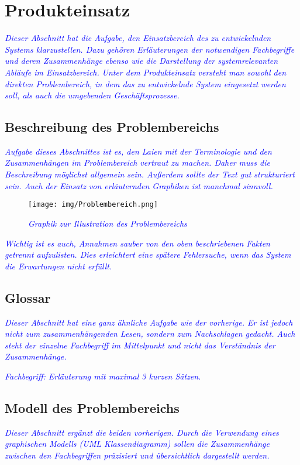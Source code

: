 \section{Produkteinsatz}
\textcolor{blue}{\textit{Dieser Abschnitt hat die Aufgabe, den Einsatzbereich des zu entwickelnden Systems klarzustellen. Dazu gehören Erläuterungen der notwendigen Fachbegriffe und deren Zusammenhänge ebenso wie die Darstellung der systemrelevanten Abläufe im Einsatzbereich.}}
\textcolor{blue}{\textit{Unter dem Produkteinsatz versteht man sowohl den direkten Problembereich, in dem das zu entwickelnde System eingesetzt werden soll, als auch die umgebenden Geschäftsprozesse.
}}

\subsection{Beschreibung des Problembereichs}
\textcolor{blue}{\textit{Aufgabe dieses Abschnittes ist es, den Laien mit der Terminologie und den Zusammenhängen im Problembereich vertraut zu machen. Daher muss die Beschreibung möglichst allgemein sein. Außerdem sollte der Text gut strukturiert sein. Auch der Einsatz von erläuternden Graphiken ist manchmal sinnvoll.}}

\begin{figure}[H]
\centering
\texttt{[image: img/Problembereich.png]}
\caption{\textcolor{blue}{\textit{Graphik zur Illustration des Problembereichs}}}
\label{Problembereich}
\end{figure}

\textcolor{blue}{\textit{Wichtig ist es auch, Annahmen sauber von den oben beschriebenen Fakten getrennt aufzulisten. Dies erleichtert eine spätere Fehlersuche, wenn das System die Erwartungen nicht erfüllt.}}

\subsection{Glossar}
\textcolor{blue}{\textit{Dieser Abschnitt hat eine ganz ähnliche Aufgabe wie der vorherige. Er ist jedoch nicht zum zusammenhängenden Lesen, sondern zum Nachschlagen gedacht. Auch steht der einzelne Fachbegriff im Mittelpunkt und nicht das Verständnis der Zusammenhänge.}}

\textcolor{blue}{\textit{Fachbegriff:  Erläuterung mit maximal 3 kurzen Sätzen.}}

\subsection{Modell des Problembereichs}
\textcolor{blue}{\textit{Dieser Abschnitt ergänzt die beiden vorherigen. Durch die Verwendung eines graphischen Modells (UML Klassendiagramm) sollen die Zusammenhänge zwischen den Fachbegriffen präzisiert und übersichtlich dargestellt werden.}}
\\

